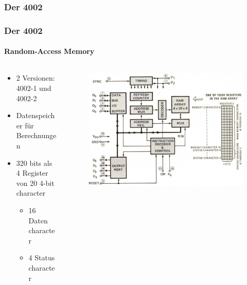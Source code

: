 \subsubsection{Der 4002}
\begin{frame}
	\frametitle{Der 4002}
	\framesubtitle{Random-Access Memory}
	\begin{columns}
		\begin{column}{.5\textwidth}	
			\begin{itemize}
				\item 2 Versionen: 4002-1 und 4002-2
				\item Datenspeicher für Berechnungen
				\item 320 bits als 4 Register von 20 4-bit character
				\begin{itemize}
					\item 16 Daten character
					\item 4 Status character
				\end{itemize}
			\end{itemize}
		\end{column}
		\begin{column}{.6\textwidth}
			\begin{figure}[ht]
				\includegraphics[width=1.1\linewidth]{images/layout_4002.png}
			\end{figure}
		\end{column}
	\end{columns}
\end{frame}

